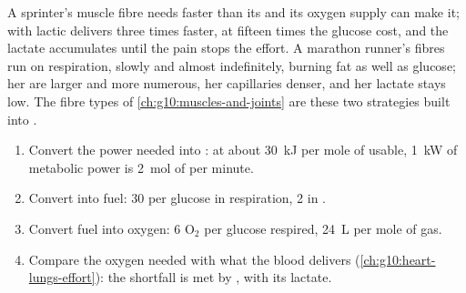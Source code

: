 \begin{example}\label{ex:g12:respiration-fermentation:muscle}
A sprinter's muscle fibre needs  faster than its  and
its oxygen supply can make it;  with lactic 
delivers  three times faster, at fifteen times the glucose cost,
and the lactate accumulates until the pain stops the effort. A
marathon runner's fibres run on respiration, slowly and almost
indefinitely, burning fat as well as glucose; her  are
larger and more numerous, her capillaries denser, and her lactate
stays low. The fibre types of \cref{ch:g10:muscles-and-joints} are
these two strategies built into .
\end{example}

\begin{method}\label{met:g12:respiration-fermentation:budget}
\begin{enumerate}
  \item Convert the power needed into : at about \qty{30}{kJ} per
        mole of  usable, \qty{1}{kW} of metabolic power is
        \qty{2}{mol} of  per minute.
  \item Convert  into fuel: 30  per glucose in respiration, 2 in
        .
  \item Convert fuel into oxygen: 6 $\mathrm{O_2}$ per glucose
        respired, \qty{24}{L} per mole of gas.
  \item Compare the oxygen needed with what the blood delivers
        (\cref{ch:g10:heart-lungs-effort}): the shortfall is met by
        , with its lactate.
\end{enumerate}
\end{method}

